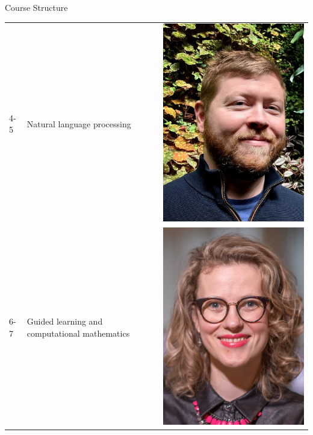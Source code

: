 \documentclass[
    NAME={Dr. Helga Ingimundardóttir},
    EMAIL={helgaingim@hi.is},
    FACULTY={Industrial Engineering},
    TITLE={Business Intelligence},
    SUBTITLE={Introduction},
    SEMINAR={IÐN610M},
    DATE={Spring, 2024}
]{HI-LaTeX/hi-beamer}
\begin{document}
\begin{frame}{Course Structure}
\begin{table}
\begin{tabular}{m{1.5cm} m{8cm} m{2.5cm}}
                4-5           & Natural language processing                   & \includegraphics[height=.1\textheight]{figures/hafsteinne} \\
                6-7           & Guided learning and computational mathematics & \includegraphics[height=.1\textheight]{figures/helgaingim} \\

\end{tabular}
\end{table}
\end{frame}
\end{document}
